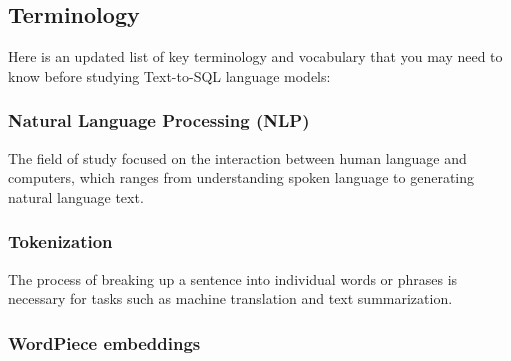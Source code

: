 \subsection{Terminology}

Here is an updated list of key terminology and vocabulary that you may need to know before studying Text-to-SQL language models:

\subsubsection{Natural Language Processing (NLP)}

The field of study focused on the interaction between human language and computers, which ranges from understanding spoken language to generating natural language text.

\subsubsection{Tokenization}

The process of breaking up a sentence into individual words or phrases is necessary for tasks such as machine translation and text summarization.

\subsubsection{WordPiece embeddings}

